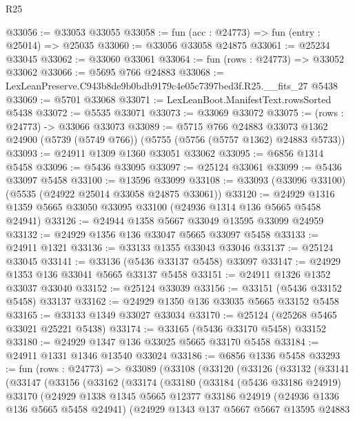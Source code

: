 \begin{lexlean}{R25}
\begin{coremodule}
@33056 := @33053 @33055
@33058 := fun (acc : @24773) => fun (entry : @25014) => @25035
@33060 := @33056 @33058 @24875
@33061 := @25234 @33045
@33062 := @33060 @33061
@33064 := fun (rows : @24773) => @33052 @33062
@33066 := @5695 @766 @24883
@33068 := LexLeanPreserve.C943b8de9b0bdb9179c4e05c7397bed3f.R25.__fits_27 @5438
@33069 := @5701 @33068
@33071 := LexLeanBoot.ManifestText.rowsSorted @5438
@33072 := @5535 @33071
@33073 := @33069 @33072
@33075 := (rows : @24773) -> @33066 @33073
@33089 := @5715
    @766
    @24883
    @33073
    @1362
    @24900
    (@5739 (@5749 @766))
    (@5755 (@5756 (@5757 @1362) @24883 @5733))
@33093 := @24911 @1309 @1360 @33051 @33062
@33095 := @6856 @1314 @5458
@33096 := @5436 @33095
@33097 := @25124 @33061
@33099 := @5436 @33097 @5458
@33100 := @13596 @33099
@33108 := @33093 (@33096 @33100) (@5535 (@24922 @25014 @33058 @24875 @33061))
@33120 := @24929 @1316 @1359 @5665 @33050 @33095 @33100 (@24936 @1314 @136 @5665 @5458 @24941)
@33126 := @24944 @1358 @5667 @33049 @13595 @33099 @24959
@33132 := @24929 @1356 @136 @33047 @5665 @33097 @5458
@33133 := @24911 @1321
@33136 := @33133 @1355 @33043 @33046
@33137 := @25124 @33045
@33141 := @33136 (@5436 @33137 @5458) @33097
@33147 := @24929 @1353 @136 @33041 @5665 @33137 @5458
@33151 := @24911 @1326 @1352 @33037 @33040
@33152 := @25124 @33039
@33156 := @33151 (@5436 @33152 @5458) @33137
@33162 := @24929 @1350 @136 @33035 @5665 @33152 @5458
@33165 := @33133 @1349 @33027 @33034
@33170 := @25124 (@25268 @5465 @33021 @25221 @5438)
@33174 := @33165 (@5436 @33170 @5458) @33152
@33180 := @24929 @1347 @136 @33025 @5665 @33170 @5458
@33184 := @24911 @1331 @1346 @13540 @33024
@33186 := @6856 @1336 @5458
@33293 := fun (rows : @24773) =>
  @33089
    (@33108
      (@33120
        (@33126
          (@33132
            (@33141
              (@33147
                (@33156
                  (@33162
                    (@33174
                      (@33180
                        (@33184
                          (@5436 @33186 @24919)
                          @33170
                          (@24929
                            @1338
                            @1345
                            @5665
                            @12377
                            @33186
                            @24919
                            (@24936 @1336 @136 @5665 @5458 @24941)
                            (@24929
                              @1343
                              @137
                              @5667
                              @5667
                              @13595
                              @24883

\end{coremodule}
\end{lexlean}
